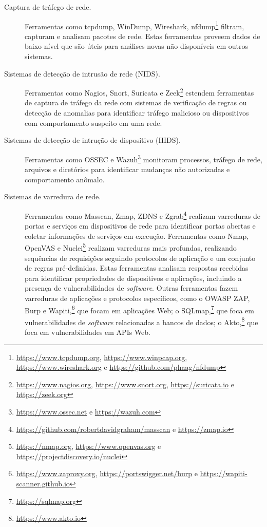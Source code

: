 \begin{description}
    \item[Captura de tráfego de rede.] Ferramentas como \textsf{tcpdump}, WinDump, Wireshark, \textsf{nfdump}\footnote{\url{https://www.tcpdump.org}, \url{https://www.winpcap.org}, \url{https://www.wireshark.org} e \url{https://github.com/phaag/nfdump}} filtram, capturam e analisam pacotes de rede. Estas ferramentas proveem dados de baixo nível que são úteis para análises novas não disponíveis em outros sistemas.

    \item[Sistemas de detecção de intrusão de rede (NIDS).] Ferramentas como Nagios, Snort, Suricata e Zeek\footnote{\url{https://www.nagios.org}, \url{https://www.snort.org}, \url{https://suricata.io} e \url{https://zeek.org}} estendem ferramentas de captura de tráfego da rede com sistemas de verificação de regras ou detecção de anomalias para identificar tráfego malicioso ou dispositivos com comportamento suspeito em uma rede.

    \item[Sistemas de detecção de intrução de dispositivo (HIDS).] Ferramentas como OSSEC e Wazuh\footnote{\url{https://www.ossec.net} e \url{https://wazuh.com}} monitoram processos, tráfego de rede, arquivos e diretórios para identificar mudanças não autorizadas e comportamento anômalo.

    \item[Sistemas de varredura de rede.] Ferramentas como Masscan, Zmap, ZDNS e Zgrab\footnote{\url{https://github.com/robertdavidgraham/masscan} e \url{https://zmap.io}} realizam varreduras de portas e serviços em dispositivos de rede para identificar portas abertas e coletar informações de serviços em execução. Ferramentas como Nmap, OpenVAS e Nuclei\footnote{\url{https://nmap.org}, \url{https://www.openvas.org} e \url{https://projectdiscovery.io/nuclei}} realizam varreduras mais profundas, realizando sequências de requisições seguindo protocolos de aplicação e um conjunto de regras pré-definidas. Estas ferramentas analisam respostas recebidas para identificar propriedades de dispositivos e aplicações, incluindo a presença de vulnerabilidades de \emph{software}. Outras ferramentas fazem varreduras de aplicações e protocolos específicos, como o OWASP ZAP, Burp e Wapiti,\footnote{\url{https://www.zaproxy.org}, \url{https://portswigger.net/burp} e \url{https://wapiti-scanner.github.io}} que focam em aplicações Web; o SQLmap,\footnote{\url{https://sqlmap.org}} que foca em vulnerabilidades de \emph{software} relacionadas a bancos de dados; o Akto,\footnote{\url{https://www.akto.io}} que foca em vulnerabilidades em APIs Web.


\end{description}

